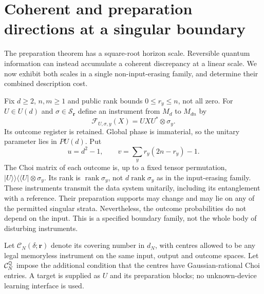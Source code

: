 \section{Coherent and preparation directions at a singular boundary}\label{sec:coherent70}
The preparation theorem has a square-root horizon scale. Reversible
quantum information can instead accumulate a coherent discrepancy at a
linear scale. We now exhibit both scales in a single non-input-erasing
family, and determine their combined description cost.

Fix $d\ge2$, $n,m\ge1$ and public rank bounds $0\le r_y\le n$, not all
zero. For $U\in U(d)$ and $\sigma\in\mathcal S_{\boldsymbol r}$ define
an instrument from $M_d$ to $M_{dn}$ by
\begin{equation}\label{eq:coherentfamily70}
 \mathcal F_{U,\sigma,y}(X)=UXU^*\otimes\sigma_y.
\end{equation}
Its outcome register is retained. Global phase is immaterial, so the
unitary parameter lies in $PU(d)$. Put
\[
 u=d^2-1,\qquad v=\sum_y r_y(2n-r_y)-1.
\]
The Choi matrix of each outcome is, up to a fixed tensor permutation,
$|U\rangle\!\rangle\langle\!\langle U|\otimes\sigma_y$. Its rank is
$\operatorname{rank}\sigma_y$, not $d\operatorname{rank}\sigma_y$ as in
the input-erasing family. These instruments transmit the data system
unitarily, including its entanglement with a reference. Their preparation
supports may change and may lie on any of the permitted singular strata.
Nevertheless, the outcome probabilities do not depend on the input. This
is a specified boundary family, not the whole body of disturbing
instruments.

Let $\mathcal C_N(\delta;\boldsymbol r)$ denote its covering number in
$d_N$, with centres allowed to be any legal memoryless instrument on the
same input, output and outcome spaces. Let $\mathcal C_N^{\mathbb Q}$ impose the
additional condition that the centres have Gaussian-rational Choi entries.
A target is supplied as $U$ and its preparation blocks; no unknown-device
learning interface is used.

